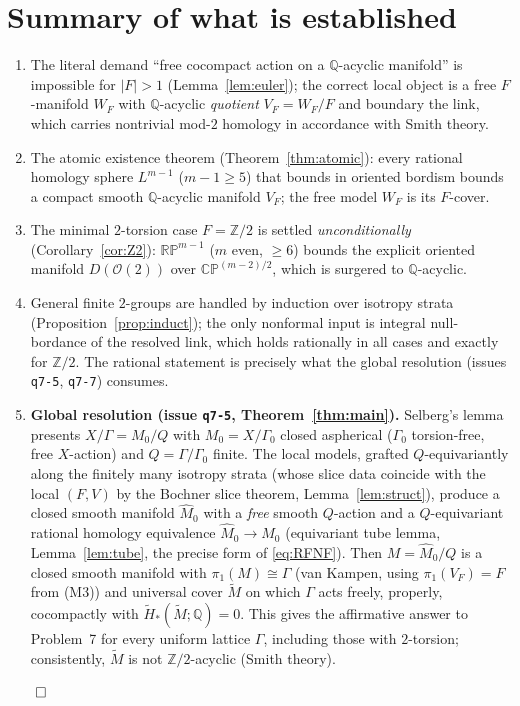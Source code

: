 \documentclass[12pt]{article}
\theoremstyle{definition}
\begin{document}
\section{Summary of what is established}\label{sec:summary}

\begin{enumerate}
\item The literal demand ``free cocompact action on a $\mathbb{Q}$-acyclic
manifold'' is impossible for $|F|>1$ (Lemma~\ref{lem:euler}); the correct local
object is a free $F$-manifold $W_F$ with $\mathbb{Q}$-acyclic \emph{quotient}
$V_F=W_F/F$ and boundary the link, which carries nontrivial mod-$2$ homology in
accordance with Smith theory.
\item The atomic existence theorem (Theorem~\ref{thm:atomic}): every rational
homology sphere $L^{m-1}$ ($m-1\ge5$) that bounds in oriented bordism bounds a
compact smooth $\mathbb{Q}$-acyclic manifold $V_F$; the free model $W_F$ is its
$F$-cover.
\item The minimal $2$-torsion case $F=\mathbb{Z}/2$ is settled
\emph{unconditionally} (Corollary~\ref{cor:Z2}): $\mathbb{RP}^{m-1}$
($m$ even, $\ge6$) bounds the explicit oriented manifold $D(\mathcal{O}(2))$
over $\mathbb{CP}^{(m-2)/2}$, which is surgered to $\mathbb{Q}$-acyclic.
\item General finite $2$-groups are handled by induction over isotropy strata
(Proposition~\ref{prop:induct}); the only nonformal input is integral
null-bordance of the resolved link, which holds rationally in all cases and
exactly for $\mathbb{Z}/2$. The rational statement is precisely what the global
resolution (issues \texttt{q7-5}, \texttt{q7-7}) consumes.
\item \textbf{Global resolution (issue \texttt{q7-5}, Theorem~\ref{thm:main}).}
Selberg's lemma presents $X/\Gamma=M_0/Q$ with $M_0=X/\Gamma_0$ closed
aspherical ($\Gamma_0$ torsion-free, free $X$-action) and $Q=\Gamma/\Gamma_0$
finite. The local models, grafted $Q$-equivariantly along the finitely many
isotropy strata (whose slice data coincide with the local $(F,V)$ by the Bochner
slice theorem, Lemma~\ref{lem:struct}), produce a closed smooth manifold
$\widehat M_0$ with a \emph{free} smooth $Q$-action and a $Q$-equivariant
rational homology equivalence $\widehat M_0\to M_0$ (equivariant tube lemma,
Lemma~\ref{lem:tube}, the precise form of \eqref{eq:RFNF}). Then
$M=\widehat M_0/Q$ is a closed smooth manifold with $\pi_1(M)\cong\Gamma$
(van Kampen, using $\pi_1(V_F)=F$ from (M3)) and universal cover $\widetilde M$
on which $\Gamma$ acts freely, properly, cocompactly with
$\widetilde H_*(\widetilde M;\mathbb{Q})=0$. This gives the affirmative answer to
Problem~7 for every uniform lattice $\Gamma$, including those with $2$-torsion;
consistently, $\widetilde M$ is not $\mathbb{Z}/2$-acyclic (Smith theory).
\end{enumerate}
\hfill$\qed$
\end{document}
